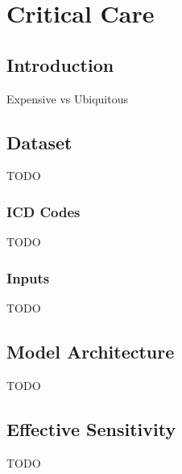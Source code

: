 \chapter{Critical Care}

\section{Introduction}
Expensive vs Ubiquitous

\section{Dataset}
TODO

\subsection{ICD Codes}
TODO

\subsection{Inputs}
TODO

\section{Model Architecture}
TODO

\section{Effective Sensitivity}
TODO

